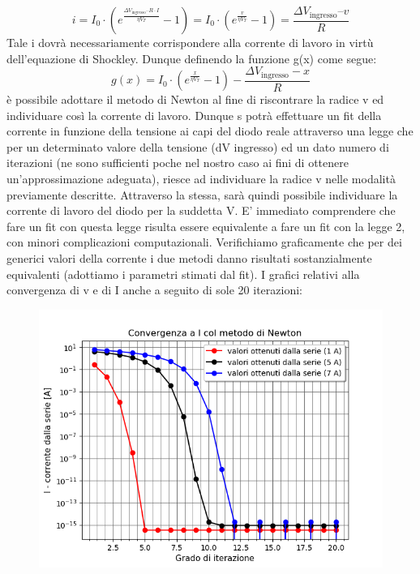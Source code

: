 \documentclass{article}[a4paper, oneside, 11pt]
\begin{document}
\begin{equation}
i = I_0 \cdot ( e^{\frac {\Delta V_{\text{ingresso}} – R \cdot I}{\eta V_T} } - 1) = I_0 \cdot (e^{\frac{v} {\eta V_T}} -1) =  \frac{\Delta V_{\text{ingresso}} – v}{R}
\end{equation}
Tale i dovrà necessariamente corrispondere alla corrente di lavoro in virtù dell’equazione di Shockley. Dunque definendo la funzione g(x) come segue:
\begin{equation}\label{eq: invsck}
g(x) = I_0 \cdot ( e^{\frac{x}{\eta V_T}} - 1)  - \frac {\Delta V_{\text{ingresso}} - x}{R}
\end{equation}
è possibile adottare il metodo di Newton al fine di riscontrare la radice v ed individuare così la corrente di lavoro. 
Dunque s potrà effettuare un fit della corrente in funzione della tensione ai capi del diodo reale attraverso una legge che per un determinato valore della tensione (dV ingresso) ed un dato numero di iterazioni (ne sono sufficienti poche nel nostro caso ai fini di ottenere un’approssimazione adeguata), riesce ad individuare la radice v  nelle modalità previamente descritte. Attraverso la stessa, sarà quindi possibile individuare la corrente di lavoro del diodo per la suddetta V. 
E’ immediato comprendere che fare un fit con questa legge risulta essere equivalente a fare un fit con la legge 2, con minori complicazioni computazionali. Verifichiamo graficamente che per dei generici valori della corrente  i due metodi danno risultati sostanzialmente equivalenti (adottiamo i parametri stimati dal fit). I grafici relativi alla convergenza di v e di I anche a seguito di sole 20 iterazioni:
\begin{figure}[H]
	\centering 
 		\includegraphics[scale=0.75]{./Figura2_appendiceB.png}
\end{figure}
\end{document}
